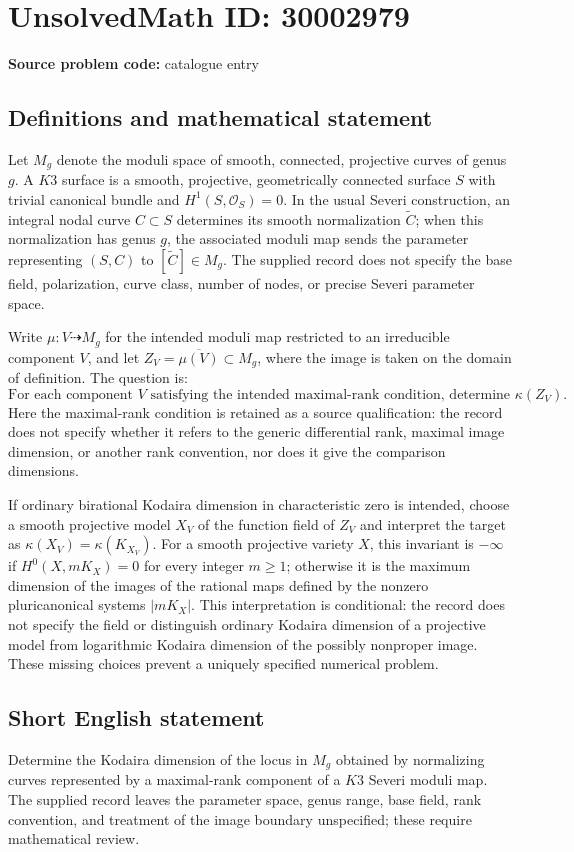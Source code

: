 \documentclass[11pt]{article}
\begin{document}
\section*{UnsolvedMath ID: 30002979}
\textbf{Source problem code:} catalogue entry
\subsection{Definitions and mathematical statement}
Let \(M_g\) denote the moduli space of smooth, connected, projective curves of genus \(g\). A \(K3\) surface is a smooth, projective, geometrically connected surface \(S\) with trivial canonical bundle and \(H^1(S,\mathcal O_S)=0\). In the usual Severi construction, an integral nodal curve \(C\subset S\) determines its smooth normalization \(\widetilde C\); when this normalization has genus \(g\), the associated moduli map sends the parameter representing \((S,C)\) to \([\widetilde C]\in M_g\). The supplied record does not specify the base field, polarization, curve class, number of nodes, or precise Severi parameter space.

Write \(\mu\colon V\dashrightarrow M_g\) for the intended moduli map restricted to an irreducible component \(V\), and let \(Z_V=\overline{\mu(V)}\subset M_g\), where the image is taken on the domain of definition. The question is:
\[
\text{For each component }V\text{ satisfying the intended maximal-rank condition, determine }\kappa(Z_V).
\]
Here the maximal-rank condition is retained as a source qualification: the record does not specify whether it refers to the generic differential rank, maximal image dimension, or another rank convention, nor does it give the comparison dimensions.

If ordinary birational Kodaira dimension in characteristic zero is intended, choose a smooth projective model \(X_V\) of the function field of \(Z_V\) and interpret the target as \(\kappa(X_V)=\kappa(K_{X_V})\). For a smooth projective variety \(X\), this invariant is \(-\infty\) if \(H^0(X,mK_X)=0\) for every integer \(m\geq1\); otherwise it is the maximum dimension of the images of the rational maps defined by the nonzero pluricanonical systems \(|mK_X|\). This interpretation is conditional: the record does not specify the field or distinguish ordinary Kodaira dimension of a projective model from logarithmic Kodaira dimension of the possibly nonproper image. These missing choices prevent a uniquely specified numerical problem.
\subsection{Short English statement}
Determine the Kodaira dimension of the locus in \(M_g\) obtained by normalizing curves represented by a maximal-rank component of a \(K3\) Severi moduli map. The supplied record leaves the parameter space, genus range, base field, rank convention, and treatment of the image boundary unspecified; these require mathematical review.
\end{document}
